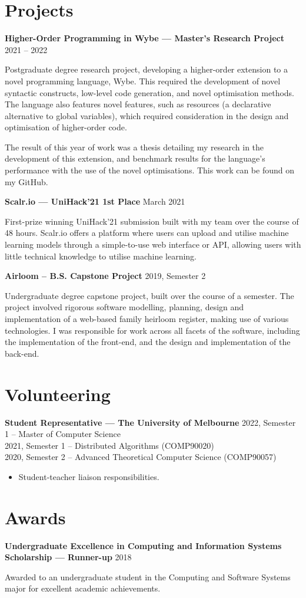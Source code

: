 \documentclass[9pt]{extarticle}
\newcommand{\entry}[3]{
    \textbf{#1} \newline
    {\footnotesize #2}
    \vspace{.05em}
    \begin{flushleft}
        #3
    \end{flushleft}
}
\begin{document}
\pagebreak

\section{Projects}

\entry{Higher-Order Programming in Wybe --- Master's Research Project}
{2021 -- 2022}
{
    Postgraduate degree research project, developing a higher-order extension to a novel programming language, Wybe.
    This required the development of novel syntactic constructs, low-level code generation, and novel optimisation methods.
    The language also features novel features, such as resources (a declarative alternative to global variables), which 
    required consideration in the design and optimisation of higher-order code.

    The result of this year of work was a thesis detailing my research in the development of this extension, and 
    benchmark results for the language's performance with the use of the novel optimisations. This work can be found on my GitHub.
}
\vspace{1.5em}

\entry{Scalr.io --- UniHack'21 1st Place}
{March 2021}
{
    First-prize winning UniHack'21 submission built with my team over the course of 48 hours. 
    Scalr.io offers a platform where users can upload and utilise machine learning models through a simple-to-use web interface or API,
    allowing users with little technical knowledge to utilise machine learning. 
}
\vspace{1.5em}

\entry{Airloom -- B.S. Capstone Project}
{2019, Semester 2}
{
    Undergraduate degree capstone project, built over the course of a semester. The project involved rigorous software modelling,
    planning, design and implementation of a web-based family heirloom register, making use of various technologies.
    I was responsible for work across all facets of the software, including the implementation of the front-end, 
    and the design and implementation of the back-end.
}
\vspace{1.5em}

\medskip

\section{Volunteering}

\entry{Student Representative --- The University of Melbourne}
{
    2022, Semester 1 -- Master of Computer Science \\
    2021, Semester 1 -- Distributed Algorithms (COMP90020) \\
    2020, Semester 2 -- Advanced Theoretical Computer Science (COMP90057)
}
{
    \begin{itemize}
        \item Student-teacher liaison responsibilities.
    \end{itemize}
}

\medskip

\section{Awards}

\entry{Undergraduate Excellence in Computing and Information Systems Scholarship --- Runner-up}
{2018} 
{
    Awarded to an undergraduate student in the Computing and Software Systems major for excellent academic achievements.
}
\end{document}
